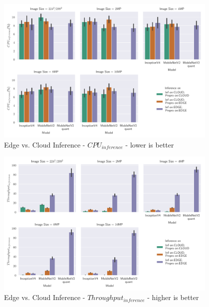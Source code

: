 \begin{figure}[!htb]
\centering
\includegraphics[width=0.95\textwidth]{./Bilder/single_plots/edge_vs_cloud_plots/Edge_vs_Cloud_Inference_Inference_CPU.pdf}
\caption{Edge vs. Cloud Inference -  $CPU_{inference}$ - lower is better}
\label{fig:EdgeVsCloudInferenceCPU}
\end{figure}


\begin{figure}[!htb]
\centering
\includegraphics[width=0.95\textwidth]{./Bilder/single_plots/edge_vs_cloud_plots/Edge_vs_Cloud_Inference_Throughput_without_Preprocessing.pdf}
\caption{Edge vs. Cloud Inference -  $Throughput_{inference}$ - higher is better}
\label{fig:EdgeVsCloudinferneceThroughput}
\end{figure}

